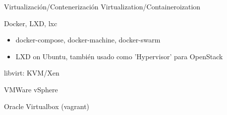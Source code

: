 \begin{cventries}
  \cventry
    {Virtualización/Contenerización}
    {Virtualization/Containeroization}
    {}
    {}
    {
      \begin{cvitems}
        \item Docker, LXD, lxc
          \begin{itemize}
            \item docker-compose, docker-machine, docker-swarm
            \item LXD on Ubuntu, también usado como 'Hypervisor' para OpenStack
          \end{itemize}
        \item libvirt: KVM/Xen
        \item VMWare vSphere
        \item Oracle Virtualbox (vagrant)
      \end{cvitems}
    }


\end{cventries}
